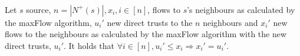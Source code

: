 \begin{theorem} \ \\
   \label{saturation} 
   Let $s$ source, $n = |N^{+}(s)|, x_i, i \in [n]$, flows to $s$'s neighbours as calculated by the 
   maxFlow algorithm, $u_i'$ new direct trusts to the $n$ neighbours and $x_i'$ new flows to the neighbours 
   as calculated by the maxFlow algorithm with the new direct trusts, $u_i'$. It holds that 
   $\forall i \in [n], u_i' \leq x_i \Rightarrow x_i' = u_i'$. 
\end{theorem} 
